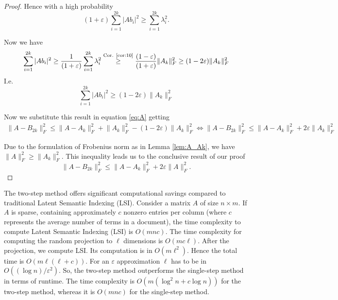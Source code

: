 \documentclass[a4paper,11pt,DIV=15]{scrartcl} %
\renewcommand{\epsilon}{\varepsilon}
\theoremstyle{plain}
\theoremstyle{definition}
\begin{document}
\begin{proof}
Hence with a high probability
\[
(1+\epsilon) \sum_{i=1}^{2k} |A b_i|^2 \geq \sum_{i=1}^{2k} \lambda_i^2.
\]

Now we have
\begin{align*}
    \sum_{i=1}^{2k} |A b_i|^2 \geq \dfrac{1}{(1+\epsilon)} \sum_{i=1}^{2k} \lambda_i^2 
    \overset{\text{Cor. \ref{cor:10}}}{\geq} \dfrac{(1-\epsilon)}{(1+\epsilon)} \lVert A_k \rVert_F^2 
    \geq (1-2\epsilon) \lVert A_k \rVert_F^2
\end{align*}
I.e.
\[
\sum_{i=1}^{2k} |A b_i|^2 \geq (1-2\epsilon) \lVert A_k \rVert_F^2
\]

Now we substitute this result in equation \ref{eq:A} getting
\begin{align*}
    \lVert A - B_{2k} \rVert_F^2 \leq \lVert A - A_k \rVert_F^2 + \lVert A_k \rVert_F^2 - (1-2\epsilon) \lVert A_k \rVert_F^2 
\iff \lVert A - B_{2k} \rVert_F^2 \leq \lVert A - A_k \rVert_F^2 + 2\epsilon\lVert A_k \rVert_F^2
\end{align*}

Due to the formulation of Frobenius norm as in Lemma \ref{lem:A_Ak}, %
 we have  $\lVert A \rVert_F^2 \geq \lVert A_k \rVert_F^2$. This inequality leads us to the conclusive result of our proof
\[
\lVert A - B_{2k} \rVert_F^2 \leq \lVert A - A_k \rVert_F^2 + 2\epsilon\lVert A \rVert_F^2.
\]
\end{proof}

The two-step method offers significant computational savings compared to traditional Latent Semantic Indexing (LSI).
Consider a matrix \( A \) of size \( n \times m \). If \( A \) is sparse, containing approximately \( c \) nonzero entries per column (where \( c \) represents the average number of terms in a document), the time complexity to compute Latent Semantic Indexing (LSI) is \( O(mnc) \).
The time complexity for computing the random projection to \( \ell \) dimensions is \( O(mc\ell) \).
After the projection, we compute LSI. Its computation is in $O(m\ell^2)$. Hence the total time is $O(m\ell(\ell+c))$.
For an $\epsilon$ approximation $\ell$ has to be in $O((\log n)/\epsilon^2)$. 
So, the two-step method outperforms the single-step method in terms of runtime. The time complexity is \(O(m(\log^2 n + c \log n))\) for the two-step method, whereas it is \(O(mnc)\) for the single-step method.
\end{document}

